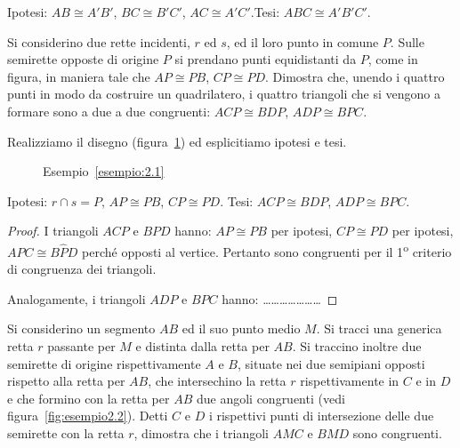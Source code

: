 \begin{inaccessibleblock}
  \begin{figure}[htb]
    \centering
  \end{figure}
\end{inaccessibleblock}

\noindent Ipotesi: $AB\cong A'B'$, $BC\cong B'C'$, $AC\cong 
A'C'$.\tab Tesi: $ABC\cong A'B'C'$.


\begin{exrig}
\begin{esempio}\label{esempio:2.1}
Si considerino due rette incidenti, $r$ ed $s$, ed il loro punto in 
comune $P$. Sulle semirette opposte di origine $P$ si prendano punti 
equidistanti da $P$, come in figura, in maniera tale che $AP\cong 
PB$, $CP\cong PD$. Dimostra che, unendo i quattro punti in modo da 
costruire un quadrilatero, i quattro triangoli che si vengono a 
formare sono a due a due congruenti: $ACP\cong BDP$, $ADP\cong BPC$.

Realizziamo il disegno (figura~\ref{fig:esempio2.1}) ed esplicitiamo 
ipotesi e tesi.


\begin{inaccessibleblock}
 \begin{figure}[htb]
\centering
\caption{Esempio~\ref{esempio:2.1}}\label{fig:esempio2.1}
\end{figure}
\end{inaccessibleblock}

\noindent Ipotesi: $r\cap s=P$, $AP\cong PB$, $CP\cong PD$.\tab\tab 
Tesi: $ACP\cong BDP$, $ADP\cong BPC$.

\begin{proof}
I triangoli $ACP$ e $BPD$ hanno: $AP\cong PB$ per ipotesi, $CP\cong 
PD$ per ipotesi, $A\widehat{P}C\cong B\widehat{P}D$ perché opposti al 
vertice. Pertanto sono congruenti per il 1\textsuperscript{o} 
criterio di congruenza dei triangoli.

Analogamente, i triangoli $ADP$ e $BPC$ hanno: 
\ldots\ldots\ldots\ldots\ldots\ldots\ldots
\end{proof}
\end{esempio}

\begin{esempio}\label{esempio:2.2}
Si considerino un segmento $AB$ ed il suo punto medio $M$. Si tracci 
una generica retta $r$ passante per $M$ e distinta dalla retta per 
$AB$. Si traccino inoltre due semirette di origine rispettivamente 
$A$ e $B$, situate nei due semipiani opposti rispetto alla retta per 
$AB$, che intersechino la retta $r$ rispettivamente in $C$ e in $D$ e 
che formino con la retta per $AB$ due angoli congruenti (vedi 
figura~\ref{fig:esempio2.2}). Detti $C$ e $D$ i rispettivi punti di 
intersezione delle due semirette con la retta $r$, dimostra che i 
triangoli $AMC$ e $BMD$ sono congruenti.



\end{esempio}
\end{exrig}
